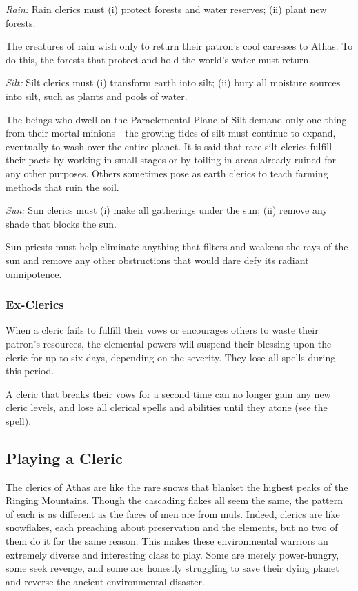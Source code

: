 \textit{Rain:} Rain clerics must
	(i) protect forests and water reserves;
	(ii) plant new forests.

The creatures of rain wish only to return their patron's cool caresses to Athas. To do this, the forests that protect and hold the world's water must return.

\textit{Silt:} Silt clerics must
	(i) transform earth into silt;
	(ii) bury all moisture sources into silt, such as plants and pools of water.

The beings who dwell on the Paraelemental Plane of Silt demand only one thing from their mortal minions---the growing tides of silt must continue to expand, eventually to wash over the entire planet. It is said that rare silt clerics fulfill their pacts by working in small stages or by toiling in areas already ruined for any other purposes. Others sometimes pose as earth clerics to teach farming methods that ruin the soil.

\textit{Sun:} Sun clerics must
	(i) make all gatherings under the sun;
	(ii) remove any shade that blocks the sun.

Sun priests must help eliminate anything that filters and weakens the rays of the sun and remove any other obstructions that would dare defy its radiant omnipotence.

\subsubsection{Ex-Clerics}
When a cleric fails to fulfill their vows or encourages others to waste their patron's resources, the elemental powers will suspend their blessing upon the cleric for up to six days, depending on the severity. They lose all spells during this period.

A cleric that breaks their vows for a second time can no longer gain any new cleric levels, and lose all clerical spells and abilities until they atone (see the  spell).


\subsection{Playing a Cleric}
The clerics of Athas are like the rare snows that blanket the highest peaks of the Ringing Mountains. Though the cascading flakes all seem the same, the pattern of each is as different as the faces of men are from muls. Indeed, clerics are like snowflakes, each preaching about preservation and the elements, but no two of them do it for the same reason. This makes these environmental warriors an extremely diverse and interesting class to play. Some are merely power-hungry, some seek revenge, and some are honestly struggling to save their dying planet and reverse the ancient environmental disaster.

